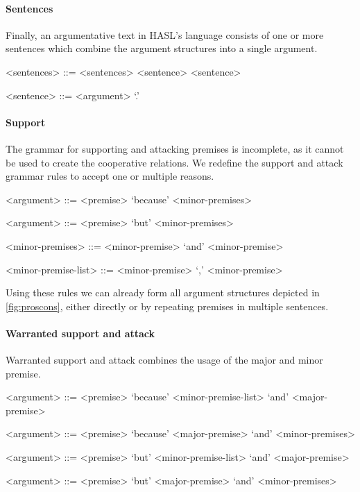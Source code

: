 \paragraph{Sentences} Finally, an argumentative text in HASL's language consists of one or more sentences which combine the argument structures into a single argument.

\begin{grammar}
<sentences> ::= <sentences> <sentence>
    \alt <sentence>

<sentence> ::= <argument> `.'

\paragraph{Support} The grammar for supporting and attacking premises is incomplete, as it cannot be used to create the cooperative relations. We redefine the support and attack grammar rules to accept one or multiple reasons.

\begin{grammar}
<argument> ::= <premise> `because' <minor-premises> %

<argument> ::= <premise> `but' <minor-premises> %

<minor-premises> ::= <minor-premise>
 `and' <minor-premise>

<minor-premise-list> ::= <minor-premise>
 `,' <minor-premise>
\end{grammar}

\noindent Using these rules we can already form all argument structures depicted in \autoref{fig:proscons}, either directly or by repeating premises in multiple sentences.

\paragraph{Warranted support and attack} Warranted support and attack combines the usage of the major and minor premise.

\begin{grammar}
<argument> ::= <premise> `because' <minor-premise-list> `and' <major-premise> %

<argument> ::= <premise> `because' <major-premise> `and' <minor-premises> %

<argument> ::= <premise> `but' <minor-premise-list> `and' <major-premise> %

<argument> ::= <premise> `but' <major-premise> `and' <minor-premises> %
\end{grammar}


\end{grammar}
